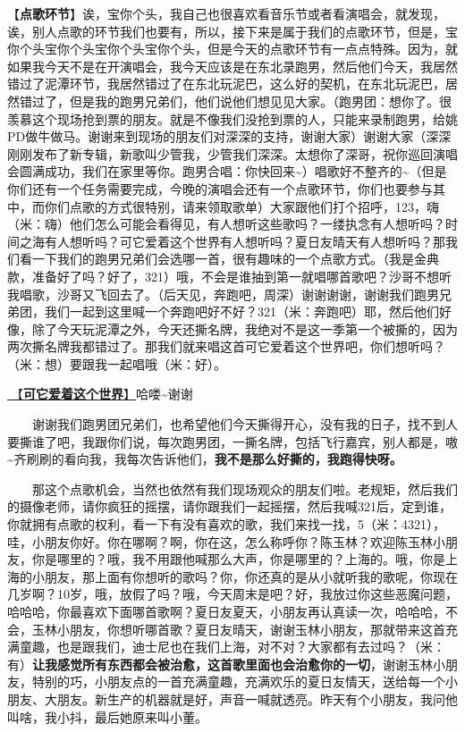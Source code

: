 \documentclass[]{ctexbook}
\begin{document}
【\textbf{点歌环节}】诶，宝你个头，我自己也很喜欢看音乐节或者看演唱会，就发现，诶，别人点歌的环节我们也要有，所以，接下来是属于我们的点歌环节，但是，宝你个头宝你个头宝你个头宝你个头，但是今天的点歌环节有一点点特殊。因为，就如果我今天不是在开演唱会，我今天应该是在东北录跑男，然后他们今天，我居然错过了泥潭环节，我居然错过了在东北玩泥巴，这么好的契机，在东北玩泥巴，居然错过了，但是我的跑男兄弟们，他们说他们想见见大家。（跑男团：想你了。很羡慕这个现场抢到票的朋友。就是不像我们没抢到票的人，只能来录制跑男，给姚PD做牛做马。谢谢来到现场的朋友们对深深的支持，谢谢大家）谢谢大家（深深刚刚发布了新专辑，新歌叫少管我，少管我们深深。太想你了深哥，祝你巡回演唱会圆满成功，我们在家里等你。跑男合唱：你快回来\textasciitilde）唱歌好不整齐的\textasciitilde（但是你们还有一个任务需要完成，今晚的演唱会还有一个点歌环节，你们也要参与其中，而你们点歌的方式很特别，请来领取歌单）大家跟他们打个招呼，123，嗨（米：嗨）他们怎么可能会看得见，有人想听这些歌吗？一缕执念有人想听吗？时间之海有人想听吗？可它爱着这个世界有人想听吗？夏日友晴天有人想听吗？那我们看一下我们的跑男兄弟们会选哪一首，很有趣味的一个点歌方式。（我是金典款，准备好了吗？好了，321）哦，不会是谁抽到第一就唱哪首歌吧？沙哥不想听我唱歌，沙哥又飞回去了。（后天见，奔跑吧，周深）谢谢谢谢，谢谢我们跑男兄弟团，我们一起到这里喊一个奔跑吧好不好？321（米：奔跑吧）耶，然后他们好像，除了今天玩泥潭之外，今天还撕名牌，我绝对不是这一季第一个被撕的，因为两次撕名牌我都错过了。那我们就来唱这首可它爱着这个世界吧，你们想听吗？（米：想）要跟我一起唱哦（米：好）。

\hyperref[love-the-world]{🎵【\textbf{可它爱着这个世界}】}哈喽\textasciitilde 谢谢

  谢谢我们跑男团兄弟们，也希望他们今天撕得开心，没有我的日子，找不到人要撕谁了吧，我跟你们说，每次跑男团，一撕名牌，包括飞行嘉宾，别人都是，嗷\textasciitilde 齐刷刷的看向我，我每次告诉他们，\textbf{我不是那么好撕的，我跑得快呀。}

  那这个点歌机会，当然也依然有我们现场观众的朋友们啦。老规矩，然后我们的摄像老师，请你疯狂的摇摆，请你跟我们一起摇摆，然后我喊321后，定到谁，你就拥有点歌的权利，看一下有没有喜欢的歌，我们来找一找，5（米：4321），哇，小朋友你好。你在哪啊？啊，你在这，怎么称呼你？陈玉林？欢迎陈玉林小朋友，你是哪里的？哦，我不用跟他喊那么大声，你是哪里的？上海的。哦，你是上海的小朋友，那上面有你想听的歌吗？你，你还真的是从小就听我的歌呢，你现在几岁啊？10岁，哦，放假了吗？哦，今天周末是吧？好，我放过你这些恶魔问题，哈哈哈，你最喜欢下面哪首歌啊？夏日友夏天，小朋友再认真读一次，哈哈哈，不会，玉林小朋友，你想听哪首歌？夏日友晴天，谢谢玉林小朋友，那就带来这首充满童趣，也是跟我们，迪士尼也在我们上海，对不对？大家都有去过吗？（米：有）\textbf{让我感觉所有东西都会被治愈，这首歌里面也会治愈你的一切}，谢谢玉林小朋友，特别的巧，小朋友点的一首充满童趣，充满欢乐的夏日友情天，送给每一个小朋友、大朋友。新生产的机器就是好，声音一喊就透亮。昨天有个小朋友，我问他叫啥，我小抖，最后她原来叫小董。
\end{document}
